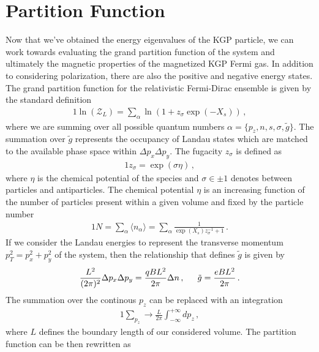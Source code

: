 \section{Partition Function}\label{sec:partition}
\noindent Now that we've obtained the energy eigenvalues of the KGP particle, we can work towards evaluating the grand partition function of the system and ultimately the magnetic properties of the magnetized KGP Fermi gas. In addition to considering polarization, there are also the positive and negative energy states. The grand partition function for the relativistic Fermi-Dirac ensemble is given by the standard definition
\begin{alignat}{1}
    \label{PartFunc} \ln\left(\mathcal{Z}_{L}\right)=\sum_{\alpha}\ln\left(1+z_{\sigma}\exp(-X_{s})\right)\,,
\end{alignat}
where we are summing over all possible quantum numbers $\alpha = \{p_{z},n,s,\sigma,\tilde{g}\}$. The summation over $\tilde{g}$ represents the occupancy of Landau states which are matched to the available phase space within $\Delta p_{x}\Delta p_{y}$. The fugacity $z_{\sigma}$ is defined as
\begin{alignat}{1}
    \label{Fugacity} z_{\sigma}=\exp\left(\sigma\eta\right)\,,
\end{alignat}
where $\eta$ is the chemical potential of the species and $\sigma\in\pm1$ denotes between particles and antiparticles. The chemical potential $\eta$ is an increasing function of the number of particles present within a given volume and fixed by the particle number
\begin{alignat}{1}
  \label{Number} N=\sum_{\alpha}\langle n_{\alpha}\rangle=\sum_{\alpha}\frac{1}{\exp(X_{s})z_{\sigma}^{-1}+1}\,.
\end{alignat}
If we consider the Landau energies to represent the transverse momentum $p_{T}^{2}=p_{x}^{2}+p_{y}^{2}$ of the system, then the relationship that defines $\tilde{g}$ is given by
\begin{alignat}{1}
    \label{PhaseSpace} \frac{L^{2}}{(2\pi)^{2}}\Delta p_{x}\Delta p_{y}=\frac{qBL^{2}}{2\pi}\Delta n\,,\indent \tilde{g}=\frac{eBL^{2}}{2\pi}\,.
\end{alignat}
The summation over the continous $p_{z}$ can be replaced with an integration
\begin{alignat}{1}
    \label{pzInt} \sum_{p_{z}}\rightarrow\frac{L}{2\pi}\int^{+\infty}_{-\infty}dp_{z}\,,
\end{alignat}
where $L$ defines the boundary length of our considered volume. The partition function  can be then rewritten as
